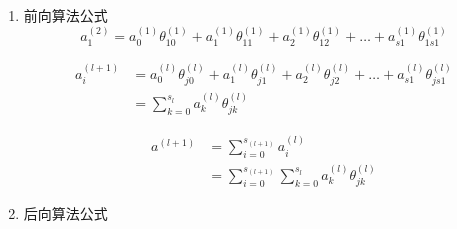 
\begin{enumerate}
\item 前向算法公式
\begin{equation}
	a_1^{(2)} = a_0^{(1)}\theta_{10}^{(1)}
	+ a_1^{(1)}\theta_{11}^{(1)}
	+ a_2^{(1)}\theta_{12}^{(1)}
	+ \dots
	+ a_{s1}^{(1)}\theta_{1s1}^{(1)}
\end{equation}

\begin{equation} \begin{aligned}
	a_i^{(l+1)}  & = a_0^{(l)}\theta_{j0}^{(l)} + a_1^{(l)}\theta_{j1}^{(l)} + a_2^{(l)}\theta_{j2}^{(l)} + \dots + a_{s1}^{(l)}\theta_{js1}^{(l)}
	\\ &= \sum_{k=0}^{s_l}{a_k^{(l)}\theta_{jk}^{(l)}}
\end{aligned}\end{equation}

\begin{equation} \begin{aligned}
	a^{(l+1)} &= \sum_{i=0}^{s_{(l+1)}}{a_i^{(l)}}
		\\ &= \sum_{i=0}^{s_{(l+1)}}\sum_{k=0}^{s_l}{a_k^{(l)}\theta_{jk}^{(l)}}
\end{aligned}\end{equation}



\item 后向算法公式

\end{enumerate}



